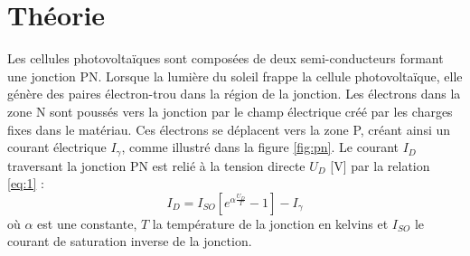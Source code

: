 \section{Théorie}

Les cellules photovoltaïques sont composées de deux semi-conducteurs formant une jonction PN. Lorsque la lumière du soleil frappe la cellule photovoltaïque, elle génère des paires électron-trou dans la région de la jonction.
Les électrons dans la zone N sont poussés vers la jonction par le champ électrique créé par les charges fixes dans le matériau. Ces électrons se déplacent vers la zone P, créant ainsi un courant électrique \(I_\gamma\), comme illustré dans la figure \ref{fig:pn}.
Le courant \(I_D\) traversant la jonction PN est relié à la tension directe \(U_D\) [\unit{\volt}] par la relation \ref{eq:1} \cite{notice}:
\begin{equation}
    I_D = I_{SO}[e^{\alpha\frac{U_D}{T}} - 1] - I_\gamma
    \label{eq:1}
\end{equation}
où \(\alpha\) est une constante, \(T\) la température de la jonction en kelvins et \(I_{SO}\) le courant de saturation inverse de la jonction.

